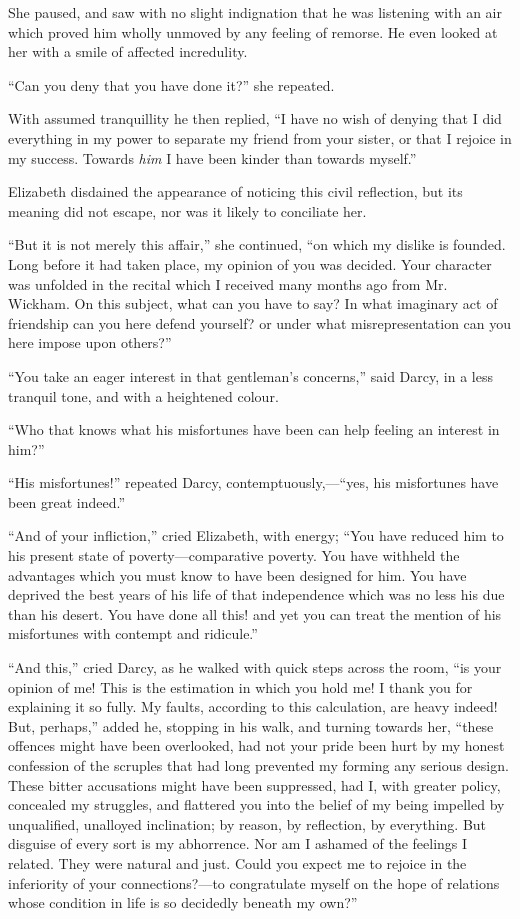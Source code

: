 \documentclass[12pt]{book}
\begin{document}
She paused, and saw with no slight indignation that he was listening with an air which proved him wholly unmoved by any feeling of remorse. He even looked at her with a smile of affected incredulity.

``Can you deny that you have done it?'' she repeated.

With assumed tranquillity he then replied, ``I have no wish of denying that I did everything in my power to separate my friend from your sister, or that I rejoice in my success. Towards \textit{him} I have been kinder than towards myself.''

Elizabeth disdained the appearance of noticing this civil reflection, but its meaning did not escape, nor was it likely to conciliate her.

``But it is not merely this affair,'' she continued, ``on which my dislike is founded. Long before it had taken place, my opinion of you was decided. Your character was unfolded in the recital which I received many months ago from Mr. Wickham. On this subject, what can you have to say? In what imaginary act of friendship can you here defend yourself? or under what misrepresentation can you here impose upon others?''

``You take an eager interest in that gentleman's concerns,'' said Darcy, in a less tranquil tone, and with a heightened colour.

``Who that knows what his misfortunes have been can help feeling an interest in him?''

``His misfortunes!'' repeated Darcy, contemptuously,---``yes, his misfortunes have been great indeed.''

``And of your infliction,'' cried Elizabeth, with energy; ``You have reduced him to his present state of poverty---comparative poverty. You have withheld the advantages which you must know to have been designed for him. You have deprived the best years of his life of that independence which was no less his due than his desert. You have done all this! and yet you can treat the mention of his misfortunes with contempt and ridicule.''

``And this,'' cried Darcy, as he walked with quick steps across the room, ``is your opinion of me! This is the estimation in which you hold me! I thank you for explaining it so fully. My faults, according to this calculation, are heavy indeed! But, perhaps,'' added he, stopping in his walk, and turning towards her, ``these offences might have been overlooked, had not your pride been hurt by my honest confession of the scruples that had long prevented my forming any serious design. These bitter accusations might have been suppressed, had I, with greater policy, concealed my struggles, and flattered you into the belief of my being impelled by unqualified, unalloyed inclination; by reason, by reflection, by everything. But disguise of every sort is my abhorrence. Nor am I ashamed of the feelings I related. They were natural and just. Could you expect me to rejoice in the inferiority of your connections?---to congratulate myself on the hope of relations whose condition in life is so decidedly beneath my own?''
\end{document}
